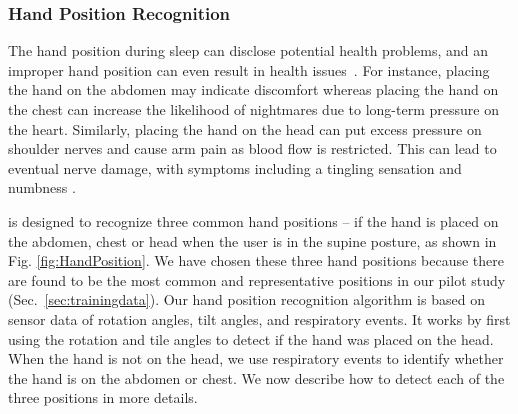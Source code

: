 \subsubsection{Hand Position Recognition\label{sec:handpr}}

The hand position during sleep can disclose potential health problems, and an improper hand position can even result in health issues~\cite{position2014}. For instance, placing the hand on the abdomen may indicate discomfort whereas placing the hand on the chest can increase the likelihood of nightmares due to long-term pressure on the heart. Similarly, placing the hand on the head can put excess pressure on shoulder nerves and cause arm pain as blood flow is restricted. This can lead to eventual nerve damage, with symptoms including a tingling sensation and numbness \cite{position2014}.


{\systemname} is designed to recognize three common hand positions -- if the hand is placed on the abdomen, chest or head when the user is in the supine posture, as shown in Fig. \ref{fig:HandPosition}. We have chosen these three hand positions because there are found to be the most common and representative positions in our pilot study (Sec.~\ref{sec:trainingdata}). Our hand position recognition algorithm is based on sensor data of rotation angles, tilt angles, and respiratory events. It works by first using the rotation and tile angles to detect if the hand was placed on the head. {When the hand is not on the head, we use respiratory events to identify whether the hand is on the abdomen or chest}. We now describe how to detect each of the three positions in more details.


